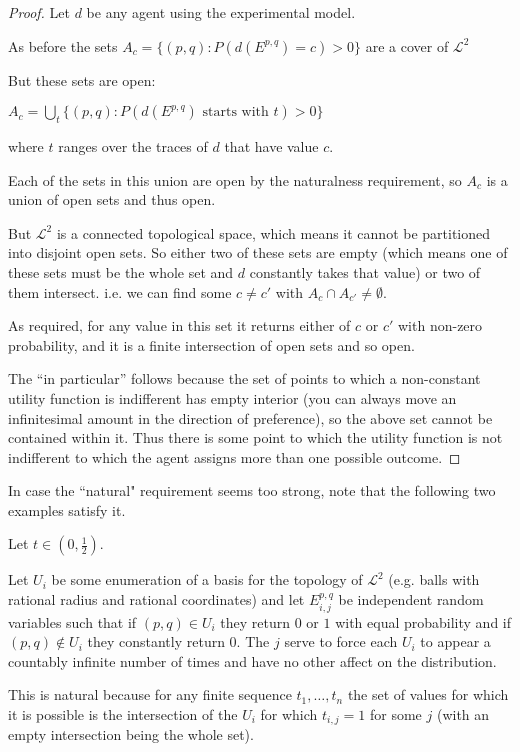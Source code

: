 \begin{proof}
Let $d$ be any agent using the experimental model. 

As before the sets
$A_c = \{(p, q): P(d(E^{p, q}) = c) > 0\}$
are a cover of $\mathcal{L}^2$

But these sets are open:

$A_c = \bigcup\limits_t \{(p, q): P(d(E^{p, q}) \text{ starts with $t$}) > 0\}$

where $t$
ranges over the traces of $d$
that have value $c$.

Each of the sets in this union are open by the naturalness requirement,
so $A_c$ is a union of open sets and thus open.

But $\mathcal{L}^2$
is a connected topological space, which means it cannot
be partitioned into disjoint open sets. So either two of these sets are empty
(which means one of these sets must be the whole set and $d$
constantly takes that value) or two of them intersect. i.e. we can find some
$c \neq c'$
with $A_c \cap A_{c'} \neq \emptyset$.

As required, for any value in this set it returns either of $c$
or $c'$
with non-zero probability, and it is a finite intersection of open sets
and so open.

The ``in particular'' follows because the set of points to which a non-constant
utility function  is indifferent has empty interior (you can always move
an infinitesimal amount in the direction of preference), so the
above set cannot be contained within it. Thus there is some point
to which the utility function is not indifferent to which the agent assigns
more than one possible outcome.
\end{proof}

In case the ``natural" requirement seems too strong, note that the following
two examples satisfy it.

\begin{example}
Let $t \in (0, \frac{1}{2})$.

Let $U_i$
be some enumeration of a basis for the topology of $\mathcal{L}^2$
(e.g. balls with rational radius and rational coordinates)
and let $E^{p, q}_{i, j}$
be independent random variables such that if $(p, q) \in U_i$
they return $0$ or $1$
with equal probability
and if $(p, q) \not\in U_i$
they constantly return $0$.
The $j$ serve to force each $U_i$ to appear a countably infinite
number of times and have no other affect on the distribution.

This is natural because for any finite sequence $t_1, \ldots, t_n$
the set of values for which it is possible is the intersection of
the $U_i$
for which $t_{i, j} = 1$
for some $j$
(with an empty intersection being the whole set).
\end{example}


